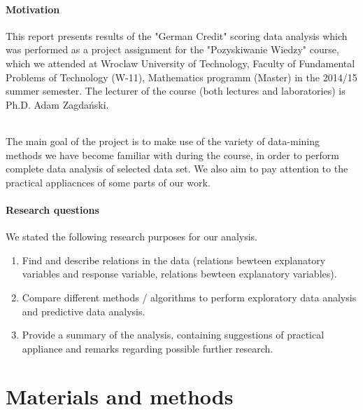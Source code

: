 \documentclass[10pt]{article}\usepackage[]{graphicx}\usepackage[]{color}
\begin{document}
\subsection{Motivation}
This report presents results of the "German Credit" scoring data analysis which was performed as a project assignment for the "Pozyskiwanie Wiedzy" course, which we attended at Wroclaw University of Technology, Faculty of Fundamental Problems of Technology (W-11), Mathematics programm (Master) in the 2014/15 summer semester. The lecturer of the course (both lectures and laboratories) is Ph.D. Adam Zagdański.

\paragraph{}
The main goal of the project is to make use of the variety of data-mining methods we have become familiar with during the course, in order to perform complete data analysis of selected data set. We also aim to pay attention to the practical appliacnces of some parts of our work. 

\subsection{Research questions}

We stated the following research purposes for our analysis. 
\begin{enumerate}
\item Find and describe relations in the data (relations bewteen explanatory variables and response variable, relations bewteen explanatory variables). 
\item Compare different methods / algorithms to perform exploratory data analysis and predictive data analysis. 
\item Provide a summary of the analysis, containing suggestions of practical appliance and remarks regarding possible further research.  
\end{enumerate}







\clearpage
\part{Materials and methods}
\end{document}
